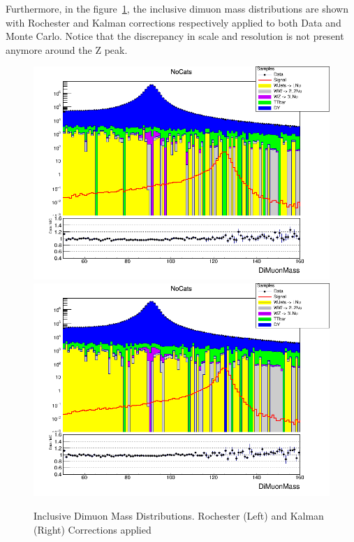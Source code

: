 Furthermore, in the figure~\ref{fig:higgs_selections_inclusivemass}, the inclusive dimuon mass distributions are shown with Rochester and Kalman corrections respectively applied to both Data and Monte Carlo. Notice that the discrepancy in scale and resolution is not present anymore around the Z peak.
\begin{figure}[hbp]
  \centering
  \includegraphics[width=0.9\linewidth]{figures/ch_higgs/distributions/baseline_rochester/distribution__NoCats__DiMuonMass__logY.png}\\
  \includegraphics[width=0.9\linewidth]{figures/ch_higgs/distributions/baseline_kalman/distribution__NoCats__DiMuonMass__logY.png}
  \caption{Inclusive Dimuon Mass Distributions. Rochester (Left) and Kalman (Right) Corrections applied}
  \label{fig:higgs_selections_inclusivemass}
\end{figure}




